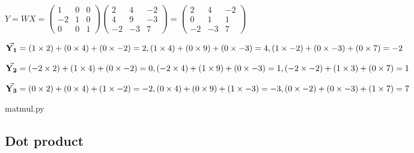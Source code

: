 \documentclass[11pt,a4paper]{article}
\begin{document}
\begin{math}
  Y = WX =
  \begin{pmatrix}
    1 & 0 & 0\\
    -2 & 1 & 0\\
    0 & 0 & 1
  \end{pmatrix}
  \begin{pmatrix}
    2 & 4 & -2\\
    4 & 9 & -3\\
    -2 & -3 & 7
  \end{pmatrix}
  =
  \begin{pmatrix}
    2 & 4 & -2\\
    0 & 1 & 1\\
    -2 & -3 & 7
  \end{pmatrix}
\end{math}

$
\vec{\mathbf{Y_1}} =\\
( 1 \times 2) + (0 \times 4) + (0 \times -2) = 2,\\
( 1 \times 4) + (0 \times 9) + (0 \times -3) = 4,\\
( 1 \times -2) + (0 \times -3) + (0 \times 7) = -2
$

$
\vec{\mathbf{Y_2}} =\\
(-2 \times 2) + (1 \times 4) + (0 \times -2) = 0,\\
(-2 \times 4) + (1 \times 9) + (0 \times -3) = 1,\\
(-2 \times -2) + (1 \times 3) + (0 \times 7) = 1
$

$
\vec{\mathbf{Y_3}} =\\
( 0 \times 2) + (0 \times 4) + (1 \times -2) = -2,\\
( 0 \times 4) + (0 \times 9) + (1 \times -3) = -3,\\
( 0 \times -2) + (0 \times -3) + (1 \times 7) = 7
$

{matmul.py}

\subsection{Dot product}
\end{document}
